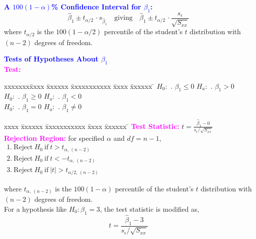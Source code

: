 \documentclass[xcolor=dvipsnames,12pt]{beamer}
\begin{document}
\begin{frame}
\textbf{\textcolor{blue}{ A {\boldmath$100(1-\alpha)$}\% Confidence Interval for {\boldmath$\beta_1$}:}}\\[.1in]
$$
\hat{\beta}_1 \pm t_{\alpha/2}\,\cdot 
s_{\hat{\beta}_{1}} \quad  
\mbox{giving} \quad 
\hat{\beta}_1 \pm t_{\alpha/2}\,\cdot \frac{s_{\epsilon}}{\sqrt{S_{xx}}}
$$
 where $t_{\alpha/2}$ is the $100(1-\alpha/2)$ percentile 
of the student's $t$ distribution with $(n-2)$ degrees of freedom.\\[.15in]
\end{frame}



\begin{frame}
\textbf{\textcolor{blue}{Tests of Hypotheses About {$\beta_1$} }}\\[.1in]
\textbf{\textcolor{magenta}{Test:}}\\[-.7in]
\begin{tabbing}
xxxxxxx\= xxxx \= xxxxxx \= xxxxxxxxxxx \= xxxx \= xxxxxx \= \kill
\>$H_0:$ . $\beta_1 \leq 0$ \> \> $H_a:$ . $\beta_1 > 0$\\
\>$H_0:$ . $\beta_1 \geq 0$ \>\> $H_a:$ . $\beta_1 < 0$\\
\>$H_0:$ . $\beta_1 = 0$ \>\>   $H_a:$ . $\beta_1 \neq 0$\\
\end{tabbing}
\begin{tabbing}
xxxx \= xxxxxx \= xxxxxxxxxxx \= xxxx \= xxxxxx \= \kill
\textbf{\textcolor{magenta}{Test Statistic:}}  \>  \> \>$ t = \frac{\hat{\beta}_1-0}{s_\epsilon/\sqrt{S_{xx}}}$\\[.1in]
\textbf{\textcolor{magenta}{Rejection Region:}}  for specified $\alpha$ and $df= n-1$,\\[.1in]
\> \>  $\begin{array}{ll}
1. \ \mathrm{Reject~} H_0 \mathrm{~if~} t > t_{\alpha,\,(n-2)} & \\
2. \ \mathrm{Reject~} H_0 \mathrm{~if~} t < -t_{\alpha,\,(n-2)} & \\
3. \ \mathrm{Reject~} H_0 \mathrm{~if~} |t| >  t_{\alpha/2,\,(n-2)} &
\end{array}$ \\[-.5in]
\end{tabbing}
\end{frame}
\begin{frame}
 where $t_{\alpha,\,(n-2)}$ is the $100(1-\alpha)$ percentile of the student's
$t$ distribution with $(n-2)$ degrees of freedom.\\[.2in]
For a hypothesis like $H_0: \beta_1 = 3$, the test statistic is
modified as,
$$
  t = \frac{\hat{\beta}_1 - 3}{s_\epsilon/\sqrt{S_{xx}}}
$$
\end{frame}
\end{document}
